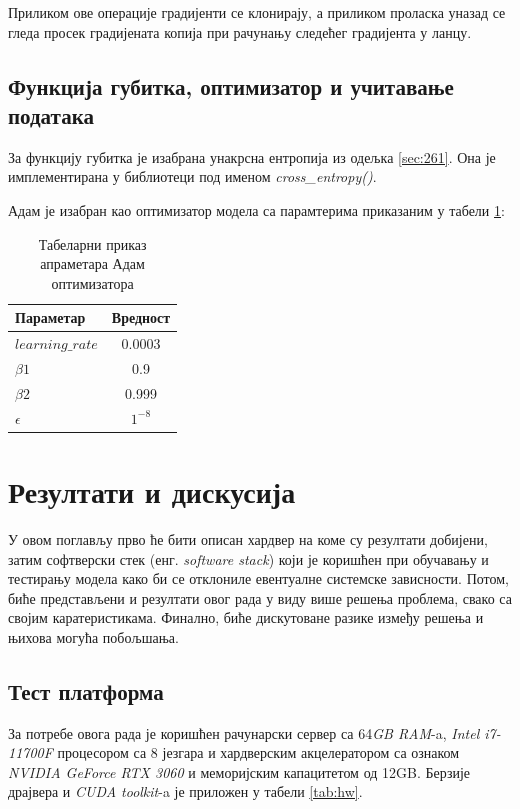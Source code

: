 \documentclass[a4paper, 12pt, master, utf8]{etf}
\begin{document}
Приликом ове операције градијенти се клонирају, а приликом проласка уназад се гледа просек градијената копија при рачунању следећег градијента у ланцу.

\section{Функција губитка, оптимизатор и учитавање података}
\label{sec:43}

За функцију губитка је изабрана унакрсна ентропија из одељка \ref{sec:261}. Она је имплементирана у библиотеци под именом \textit{cross\_entropy()}.
\newline

Адам је изабран као оптимизатор модела са парамтерима приказаним у табели \ref{tab:adam}:

\begin{table}[H]
    \centering
    \begin{tabular}{l | c}
    \hline
    Параметар & Вредност\\
    \hline
        $learning\_rate$ & 0.0003\\
        $\beta1$ & 0.9\\
        $\beta2$ & 0.999\\
        $\epsilon$ & $1^{-8}$\\
    \end{tabular}
    \caption{Табеларни приказ апраметара Адам оптимизатора}
    \label{tab:adam}
\end{table}



\chapter{Резултати и дискусија}
\label{sec:5}

У овом поглављу прво ће бити описан хардвер на коме су резултати добијени, 
затим софтверски стек (енг. \textit{software stack}) који је коришћен при 
обучавању и тестирању модела како би се отклониле евентуалне системске зависности. Потом, 
биће представљени и резултати овог рада у виду више решења проблема, свако са 
својим каратеристикама. Финално, биће дискутоване разике између решења и њихова могућа побољшања.

\section{Тест платформа}
\label{sec:51}

За потребе овога рада је коришћен рачунарски сервер са 64\textit{GB RAM}-a, \textit{Intel i7-11700F} процесором са 8 језгара и хардверским акцелератором са ознаком \textit{NVIDIA GeForce RTX 3060} и меморијским капацитетом од 12GB.
Берзије драјвера и \textit{CUDA toolkit}-a је приложен у табели \ref{tab:hw}.
\newline
\end{document}
